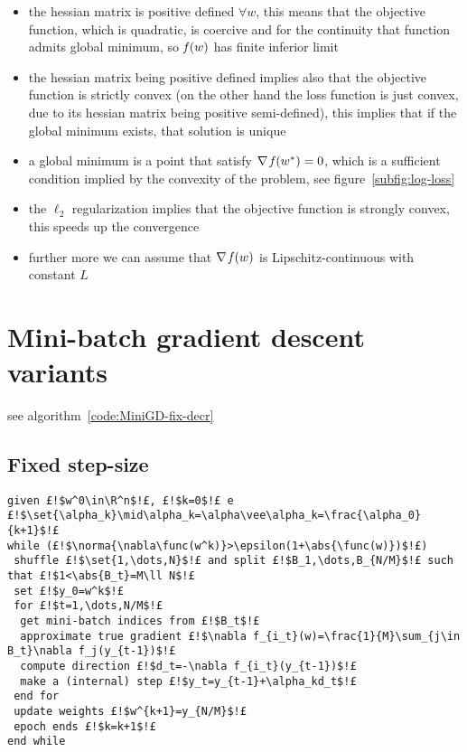\begin{itemize}
\item the hessian matrix is positive defined $\forall w$, this means that the objective function, which is quadratic, is coercive and for the continuity that function admits global minimum, so $\operatorname*{\mathit{f}}(w)$ has finite inferior limit
\item the hessian matrix being positive defined implies also that the objective function is strictly convex (on the other hand the loss function is just convex, due to its hessian matrix being positive semi-defined), this implies that if the global minimum exists, that solution is unique
\item a global minimum is a point that satisfy $\nabla\operatorname*{\mathit{f}}(w^\ast)=0$, which is a sufficient condition implied by the convexity of the problem, see figure~\vref{subfig:log-loss}
\item the $\ell_2$ regularization implies that the objective function is strongly convex, this speeds up the convergence
\item further more we can assume that $\nabla\operatorname*{\mathit{f}}(w)$ is Lipschitz-continuous with constant $L$
\end{itemize}


\cleardoublepage
\section{Mini-batch gradient descent variants}

see algorithm~\vref{code:MiniGD-fix-decr}

\subsection{Fixed step-size}

\begin{lstlisting}[style=simple,caption={Mini-batch Gradient Descent with fixed or decreasing step-size},label=code:MiniGD-fix-decr]
given £!$w^0\in\R^n$!£, £!$k=0$!£ e £!$\set{\alpha_k}\mid\alpha_k=\alpha\vee\alpha_k=\frac{\alpha_0}{k+1}$!£
while (£!$\norma{\nabla\func(w^k)}>\epsilon(1+\abs{\func(w)})$!£)
 shuffle £!$\set{1,\dots,N}$!£ and split £!$B_1,\dots,B_{N/M}$!£ such that £!$1<\abs{B_t}=M\ll N$!£
 set £!$y_0=w^k$!£
 for £!$t=1,\dots,N/M$!£
  get mini-batch indices from £!$B_t$!£
  approximate true gradient £!$\nabla f_{i_t}(w)=\frac{1}{M}\sum_{j\in B_t}\nabla f_j(y_{t-1})$!£
  compute direction £!$d_t=-\nabla f_{i_t}(y_{t-1})$!£
  make a (internal) step £!$y_t=y_{t-1}+\alpha_kd_t$!£
 end for
 update weights £!$w^{k+1}=y_{N/M}$!£
 epoch ends £!$k=k+1$!£
end while
\end{lstlisting}

